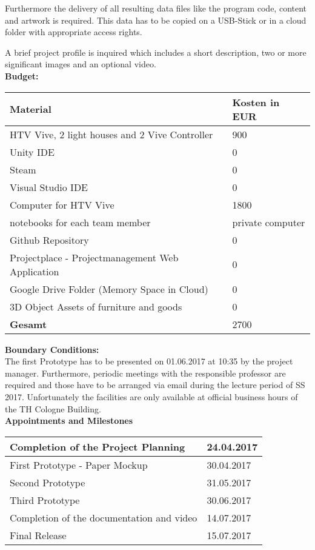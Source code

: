 \documentclass[a4paper, 12pt]{article}
\begin{document}
Furthermore the delivery of all resulting data files like the program code, content and artwork is required. This data has to be copied on a USB-Stick or in a cloud folder with appropriate access rights.

A brief project profile is inquired which includes a short description, two or more significant images and an optional video.\\


\textbf{Budget:}\\

\begin{tabular}{| l | l |}
\hline
\textbf{Material} & \textbf{Kosten in EUR}\\\hline
 HTV Vive, 2 light houses and 2 Vive Controller & 900\\  \hline
 Unity IDE  & 0\\ \hline
 Steam  & 0\\ \hline
 Visual Studio IDE  & 0\\ \hline
 Computer for HTV Vive  & 1800 \\ \hline
 notebooks for each team member  & private computer \\ \hline
 Github Repository & 0\\ \hline
Projectplace - Projectmanagement Web Application& 0\\ \hline
Google Drive Folder (Memory Space in Cloud) & 0\\ \hline
3D Object Assets of furniture and goods & 0\\ \hline
 \textbf{Gesamt} & 2700\\
 \hline
\end{tabular}
\bigskip

\textbf{Boundary Conditions:}\\

The first Prototype has to be presented on 01.06.2017 at 10:35 by the project manager. Furthermore, periodic meetings with the responsible professor are required and those have to be arranged via email during the lecture period of SS 2017. Unfortunately the facilities are only available at official business hours of the TH Cologne Building. \\

\textbf{Appointments and Milestones}\\

\begin{tabular}{|l | l |}
	\hline
	 Completion of the Project Planning & 24.04.2017\\\hline
	 First Prototype - Paper Mockup & 30.04.2017\\\hline
	 Second Prototype & 31.05.2017\\\hline
	 Third Prototype& 30.06.2017\\\hline
	 Completion of the documentation and video & 14.07.2017\\\hline
	 Final Release& 15.07.2017\\\hline
\end{tabular}
\end{document}
